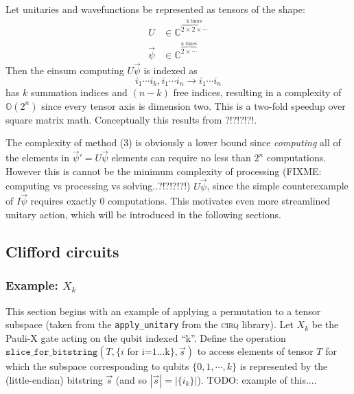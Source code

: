 \documentclass{article}
\begin{document}
\begin{enumerate}
		Let unitaries and wavefunctions be represented as tensors of the shape:
		\begin{align}
			U &\in \mathbb{C}^{\overbrace{ \scriptstyle 2 \times 2 \times \cdots}^{\text{k times}}} \\
			\vec{\psi} &\in \mathbb{C}^{\overbrace{ \scriptstyle 2 \times \cdots}^\text{n times}}
		\end{align}
		Then the einsum computing $U\vec{\psi}$ is indexed as
		$$i_1 \cdots i_k, i_1 \cdots i_n \rightarrow i_1 \cdots i_n $$
		has $k$ summation indices and $(n-k)$ free indices, resulting in a complexity of $\mathbb{O}(2^n)$ since every tensor axis is dimension two. This is a two-fold speedup over square matrix math. Conceptually this results from ?!?!?!?!.		
\end{enumerate}

The complexity of method (3) is obviously a lower bound since \textit{computing} all of the elements in $\vec{\psi}' = U \vec{\psi}$ elements can require no less than $2^n$ computations. However this is cannot be the minimum complexity of processing (FIXME: computing vs processing vs solving..?!?!?!?!) $U \vec{\psi}$, since the simple counterexample of $I \vec{\psi}$ requires exactly 0 computations. This motivates even more streamlined unitary action, which will be introduced in the following sections.

\subsection{Clifford circuits}

\subsubsection{Example: $X_k$}
\label{sec:clifford_example}
This section begins with an example of applying a permutation to a tensor subspace (taken from the \texttt{apply\_unitary} from the \textsc{cirq} library). Let $X_k$ be the Pauli-X gate acting on the qubit indexed ``k''. Define the operation $\texttt{slice\_for\_bitstring}(T, \{i\text{ for i=1...k}\}, \vec{s})$ to access elements of tensor $T$ for which the subspace corresponding to qubits $\{0, 1, \cdots, k\}$ is represented by the (little-endian) bitstring $\vec{s}$ (and so $|\vec{s}| = |\{i_k\}|$). TODO: example of this....
\end{document}
